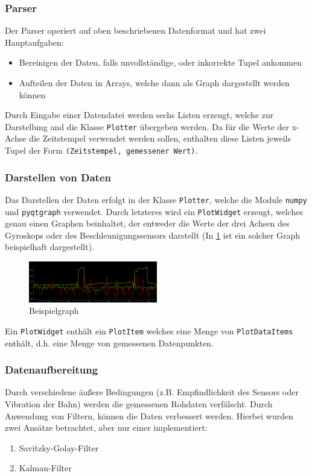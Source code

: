\subsubsection{Parser}
Der Parser operiert auf oben beschriebenen Datenformat und hat zwei Hauptaufgaben:
\begin{itemize}
 \item Bereinigen der Daten, falls unvollständige, oder inkorrekte Tupel ankommen
 \item Aufteilen der Daten in Arrays, welche dann als Graph dargestellt werden können
\end{itemize}
Durch Eingabe einer Datendatei werden sechs Listen erzeugt, welche zur Darstellung and die Klasse \texttt{Plotter} übergeben werden. Da für die Werte der x-Achse die Zeitstempel verwendet werden sollen, enthalten diese Listen jeweils Tupel der Form \texttt{(Zeitstempel, gemessener Wert)}.
\subsubsection{Darstellen von Daten}
Das Darstellen der Daten erfolgt in der Klasse \texttt{Plotter}, welche die Module \texttt{numpy} und \texttt{pyqtgraph} verwendet. Durch letzteres wird ein \texttt{PlotWidget} erzeugt, welches genau einen Graphen beinhaltet, der entweder die Werte der drei Achsen des Gyroskops oder des Beschleunigungssensors darstellt (In \ref{fig:k3_4-graph.png} ist ein solcher Graph beispielhaft dargestellt).
\begin{figure}[h]
	\centering
	\includegraphics[width=0.5\textwidth]{images/k3_4-graph.png}
	\caption {Beispielgraph}
	\label{fig:k3_4-graph.png} 
\end{figure}
Ein \texttt{PlotWidget} enthält ein \texttt{PlotItem} welches eine Menge von \texttt{PlotDataItems} enthält, d.h. eine Menge von gemessenen Datenpunkten.
\subsubsection{Datenaufbereitung}
Durch verschiedene äußere Bedingungen (z.B. Empfindlichkeit des Sensors oder Vibration der Bahn) werden die gemessenen Rohdaten verfälscht. Durch Anwendung von Filtern, können die Daten verbessert werden.
Hierbei wurden zwei Ansätze betrachtet, aber nur einer implementiert:
\begin{enumerate}
\item Savitzky-Golay-Filter
\item Kalman-Filter
\end{enumerate}
